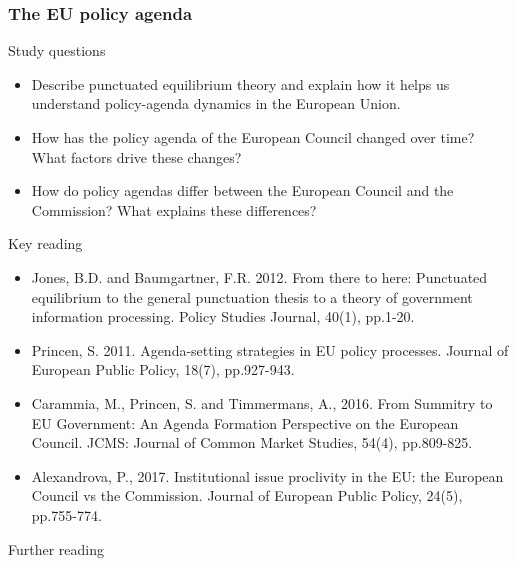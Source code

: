 \subsubsection*{The EU policy agenda}

Study questions

\begin{itemize}
	\item Describe punctuated equilibrium theory and explain how it helps us understand policy-agenda dynamics in the European Union.
	\item How has the policy agenda of the European Council changed over time? What factors drive these changes?
	\item How do policy agendas differ between the European Council and the Commission? What explains these differences?
\end{itemize}

\noindent Key reading
	
\begin{itemize}
	\item Jones, B.D. and Baumgartner, F.R. 2012. From there to here: Punctuated equilibrium to the general punctuation thesis to a theory of government information processing. Policy Studies Journal, 40(1), pp.1-20.
	\item Princen, S. 2011. Agenda-setting strategies in EU policy processes. Journal of European Public Policy, 18(7), pp.927-943.
	\item Carammia, M., Princen, S. and Timmermans, A., 2016. From Summitry to EU Government: An Agenda Formation Perspective on the European Council. JCMS: Journal of Common Market Studies, 54(4), pp.809-825.
	\item Alexandrova, P., 2017. Institutional issue proclivity in the EU: the European Council vs the Commission. Journal of European Public Policy, 24(5), pp.755-774.
\end{itemize}

\noindent Further reading


